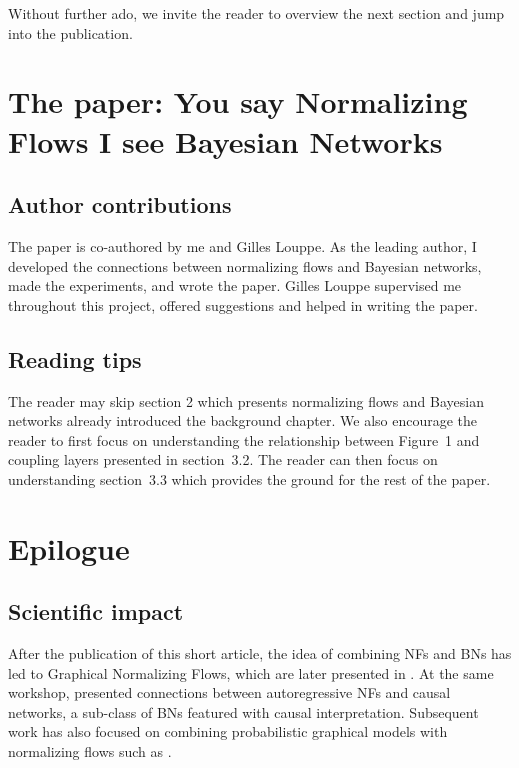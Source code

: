 Without further ado, we invite the reader to overview the next section and jump into the publication.
\vfill

\section{The paper: You say Normalizing Flows I see Bayesian Networks}

\subsection{Author contributions}
The paper is co-authored by me and Gilles Louppe. As the leading author, I developed the connections between normalizing flows and Bayesian networks, made the experiments, and wrote the paper. Gilles Louppe supervised me throughout this project, offered suggestions and helped in writing the paper.

\subsection{Reading tips}
The reader may skip section 2 which presents normalizing flows and Bayesian networks already introduced the background chapter. We also encourage the reader to first focus on understanding the relationship between Figure~1 and coupling layers presented in section~3.2. The reader can then focus on understanding section~3.3 which provides the ground for the rest of the paper.


\section{Epilogue}
\subsection{Scientific impact}
After the publication of this short article, the idea of combining NFs and BNs has led to Graphical Normalizing Flows, which are later presented in . At the same workshop, \citet{khemakhem_causal_2020} presented connections between autoregressive NFs and causal networks, a sub-class of BNs featured with causal interpretation. Subsequent work has also focused on combining probabilistic graphical models with normalizing flows such as \citet{mouton2022graphical, mouton2022siren}.


